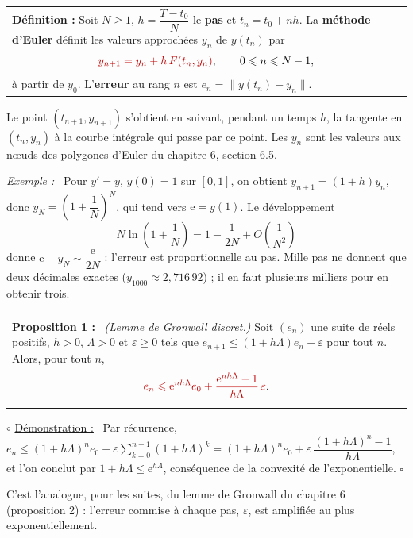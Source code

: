 \documentclass[a4paper,twoside]{report}
\makeatletter
\newcommand{\mot}[1]{\textcolor{rougecours}{\textbf{#1}}}
\newcommand{\rmath}[1]{\textcolor{rougecours}{#1}}
\newenvironment{cadre}%
 {\par\vspace{2mm}\noindent\begin{tabular}{|@{\hspace{4mm}}p{0.93\textwidth}@{\hspace{4mm}}|}
  \hline \\[-2mm]}%
 {\\[2mm] \hline \end{tabular}\par\vspace{3mm}}
\newcommand{\propo}[1]{\textbf{\underline{Proposition #1 :}}~}
\newenvironment{demo}%
 {\par\needspace{4\baselineskip}\vspace{1mm}\noindent$\circ$ \underline{Démonstration :}~\setlength{\parskip}{3pt plus 1pt}}%
 {\hfill$\square$\par\vspace{2mm}}
\newenvironment{exemple}%
 {\par\needspace{6\baselineskip}\vspace{1mm}\begin{list}{}{\leftmargin=1cm \rightmargin=0.5cm}\item[]%
  \textit{Exemple :}~}%
 {\end{list}\vspace{1mm}}
\newcommand{\ee}{\mathrm{e}}                      %
\newcommand{\norme}[1]{\lVert #1 \rVert}         %
\makeatother
\begin{document}
\begin{center}
\begin{tabularx}{15cm}{||X}
\noindent \textbf{\underline{Définition :}} Soit $N \geqslant 1$, $h = \dfrac{T - t_{0}}{N}$ le \mot{pas} et $t_{n} = t_{0} + nh$. La \mot{méthode d'Euler} définit les valeurs approchées $y_{n}$ de $y(t_{n})$ par
\[ \rmath{y_{n + 1} = y_{n} + h\,F(t_{n}, y_{n})}, \qquad 0 \leqslant n \leqslant N - 1, \]
à partir de $y_{0}$. L'\mot{erreur} au rang $n$ est $e_{n} = \norme{y(t_{n}) - y_{n}}$.
\end{tabularx}
\end{center}

\noindent Le point $(t_{n + 1}, y_{n + 1})$ s'obtient en suivant, pendant un temps $h$, la tangente en $(t_{n}, y_{n})$ à la courbe intégrale qui passe par ce point. Les $y_{n}$ sont les valeurs aux nœuds des polygones d'Euler du chapitre 6, section 6.5.

\begin{exemple}
Pour $y' = y$, $y(0) = 1$ sur $[0, 1]$, on obtient $y_{n + 1} = (1 + h)y_{n}$, donc $y_{N} = \left(1 + \dfrac{1}{N}\right)^{N}$, qui tend vers $\ee = y(1)$. Le développement
\[ N\ln\left(1 + \frac{1}{N}\right) = 1 - \frac{1}{2N} + O\left(\frac{1}{N^{2}}\right) \]
donne $\ee - y_{N} \sim \dfrac{\ee}{2N}$ : l'erreur est proportionnelle au pas. Mille pas ne donnent que deux décimales exactes ($y_{1000} \approx 2{,}716\,92$) ; il en faut plusieurs milliers pour en obtenir trois.
\end{exemple}

\begin{cadre}
\propo{1} \emph{(Lemme de Gronwall discret.)} Soit $(e_{n})$ une suite de réels positifs, $h > 0$, $\Lambda > 0$ et $\varepsilon \geqslant 0$ tels que $e_{n + 1} \leqslant (1 + h\Lambda)e_{n} + \varepsilon$ pour tout $n$. Alors, pour tout $n$,
\[ \rmath{e_{n} \leqslant \ee^{n h \Lambda}e_{0} + \frac{\ee^{n h \Lambda} - 1}{h\Lambda}\,\varepsilon}. \]
\end{cadre}

\begin{demo}
Par récurrence, $e_{n} \leqslant (1 + h\Lambda)^{n}e_{0} + \varepsilon\displaystyle\sum_{k = 0}^{n - 1}(1 + h\Lambda)^{k} = (1 + h\Lambda)^{n}e_{0} + \varepsilon\,\dfrac{(1 + h\Lambda)^{n} - 1}{h\Lambda}$, et l'on conclut par $1 + h\Lambda \leqslant \ee^{h\Lambda}$, conséquence de la convexité de l'exponentielle.
\end{demo}

\noindent C'est l'analogue, pour les suites, du lemme de Gronwall du chapitre 6 (proposition 2) : l'erreur commise à chaque pas, $\varepsilon$, est amplifiée au plus exponentiellement.
\end{document}
